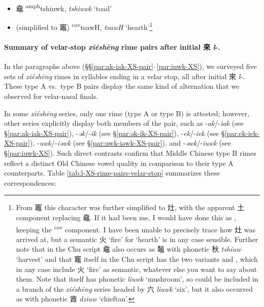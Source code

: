 \begin{itemize}
    \item {\Large{鼀}} %
    {\large{{\textsuperscript{amph}}tshiuwk}},
    \textit{tshiuwk} `toad' %

    \item 
    {\Large{}}     
 (simplified to {\Large{竈}}) %
    {\large{{\textsuperscript{cav}}tsawH}},
    \textit{tsawH} `hearth'\footnote{From 竈 this character  was further simplified to 灶, with the apparent 土 component replacing 鼀. If it had been me, I would have done this as  , keeping the \textsuperscript{cav} component. I have been unable to precisely trace how 灶 was arrived at, but a semantic 火 `fire' for `hearth' is in any case sensible. Further note that in the Chu script 鼀 also occurs as    \makebox[1.0em][l]{\raisebox{-0.1em}{}}
    䵸 with phonetic 秋 \textit{tshiuw} `harvest' and that 竈 itself in the Chu script has the two variants  \makebox[0.9em][l]{\raisebox{-0.35em}{}}
and
\makebox[1.0em][l]{\raisebox{-0.3em}{}}, which in any case include 火 `fire' as semantic, whatever else you want to say about them. Note that {} itself has phonetic {} \textit{liuwk} `mushroom', so could be included in a branch of the \textit{xiéshēng} series headed by 六 \textit{liuwk} `six', but it also occurred as  {} with phonetic 酋 \textit{dziuw} `chieftan'.}
\end{itemize}




\paragraph{Summary of velar‐stop \textit{xiéshēng} rime pairs after initial 來 \textit{l}-.} \label{par:summary-velar-stops}

In the paragraphs above (§§\ref{par:ak-iak-XS-pair}--\ref{par:iuwk-XS}), we surveyed five sets of \textit{xiéshēng} rimes in syllables ending in a velar stop, all after initial 來 \textit{l}-. These type A vs.\ type B pairs display the same kind of alternation that we observed for velar‐nasal finals.

In some \textit{xiéshēng} series, only one rime (type A or type B) is attested; however, other series explicitly display both members of the pair, such as -\textit{ak}/-\textit{iak} (see §\ref{par:ak-iak-XS-pair}), -\textit{ək}/-\textit{ik} (see §\ref{par:ək-ik-XS-pair}), -\textit{ek}/-\textit{iek} (see §\ref{par:ek-iek-XS-pair}), -\textit{uwk}/-\textit{iəwk} (see §\ref{par:uwk-iəwk-XS-pair}), and -\textit{əwk}/-\textit{iuwk} (see §\ref{par:iuwk-XS}). Such direct contrasts confirm that Middle Chinese type B rimes reflect a distinct Old Chinese vowel quality in comparison to their type A counterparts.
Table \ref{tab:l-XS-rime-pairs-velar-stop} summarizes these correspondences:

